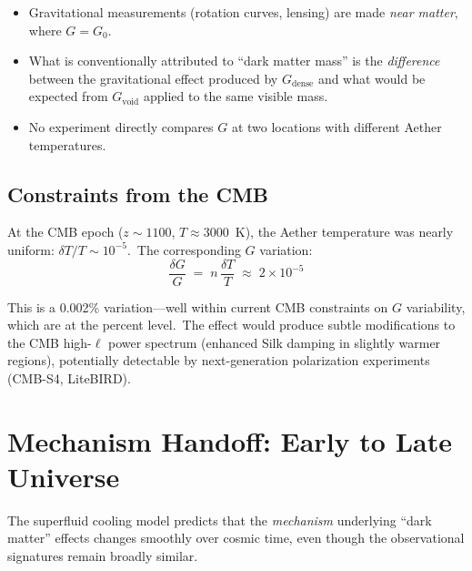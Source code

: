 \documentclass[12pt,letterpaper]{article}
\begin{document}
\begin{itemize}[leftmargin=2em]
  \item Gravitational measurements (rotation curves, lensing) are made
    \emph{near matter}, where $G = G_0$.
  \item What is conventionally attributed to ``dark matter mass'' is the
    \emph{difference} between the gravitational effect produced by
    $G_{\mathrm{dense}}$ and what would be expected from $G_{\mathrm{void}}$
    applied to the same visible mass.
  \item No experiment directly compares $G$ at two locations with different
    Aether temperatures.
\end{itemize}


\subsection{Constraints from the CMB}

At the CMB epoch ($z \sim 1100$, $T \approx 3000$~K), the Aether temperature
was nearly uniform: $\delta T/T \sim 10^{-5}$.\ The corresponding $G$ variation:
%
\begin{equation}
  \frac{\delta G}{G} \;=\; n\,\frac{\delta T}{T}
    \;\approx\; 2 \times 10^{-5}
  \label{eq:deltaG-CMB}
\end{equation}

This is a 0.002\% variation---well within current CMB constraints on $G$
variability, which are at the percent level.\ The effect would produce
subtle modifications to the CMB high-$\ell$ power spectrum (enhanced Silk
damping in slightly warmer regions), potentially detectable by next-generation
polarization experiments (CMB-S4, LiteBIRD).


\section{Mechanism Handoff: Early to Late Universe}
\label{sec:handoff}

The superfluid cooling model predicts that the \emph{mechanism} underlying
``dark matter'' effects changes smoothly over cosmic time, even though the
observational signatures remain broadly similar.
\end{document}
